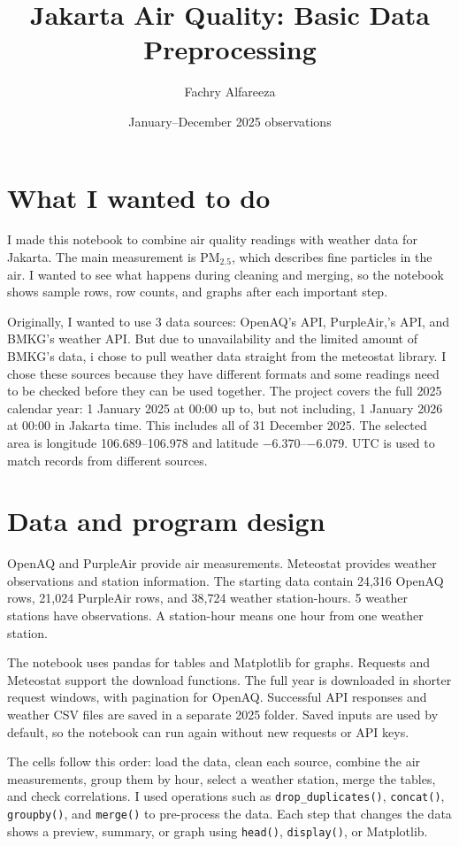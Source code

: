 \documentclass[11pt,a4paper]{article}
\title{Jakarta Air Quality: Basic Data Preprocessing}
\author{Fachry Alfareeza}
\date{January--December 2025 observations}
\begin{document}
\maketitle
\section{What I wanted to do}
I made this notebook to combine air quality readings with weather data for Jakarta. The main measurement is PM$_{2.5}$, which describes fine particles in the air. I wanted to see what happens during cleaning and merging, so the notebook shows sample rows, row counts, and graphs after each important step.

Originally, I wanted to use 3 data sources: OpenAQ's API, PurpleAir,'s API, and BMKG's weather API. But due to unavailability and the limited amount of BMKG's data, i chose to pull weather data straight from the meteostat library. I chose these sources because they have different formats and some readings need to be checked before they can be used together. The project covers the full 2025 calendar year: 1 January 2025 at 00:00 up to, but not including, 1 January 2026 at 00:00 in Jakarta time. This includes all of 31 December 2025. The selected area is longitude 106.689--106.978 and latitude $-6.370$--$-6.079$. UTC is used to match records from different sources.
\section{Data and program design}
OpenAQ and PurpleAir provide air measurements. Meteostat provides weather observations and station information. The starting data contain 24,316 OpenAQ rows, 21,024 PurpleAir rows, and 38,724 weather station-hours. 5 weather stations have observations. A station-hour means one hour from one weather station.

The notebook uses pandas for tables and Matplotlib for graphs. Requests and Meteostat support the download functions. The full year is downloaded in shorter request windows, with pagination for OpenAQ. Successful API responses and weather CSV files are saved in a separate 2025 folder. Saved inputs are used by default, so the notebook can run again without new requests or API keys.

The cells follow this order: load the data, clean each source, combine the air measurements, group them by hour, select a weather station, merge the tables, and check correlations. I used operations such as \texttt{drop\_duplicates()}, \texttt{concat()}, \texttt{groupby()}, and \texttt{merge()} to pre-process the data. Each step that changes the data shows a preview, summary, or graph using \texttt{head()}, \texttt{display()}, or Matplotlib.
\end{document}
